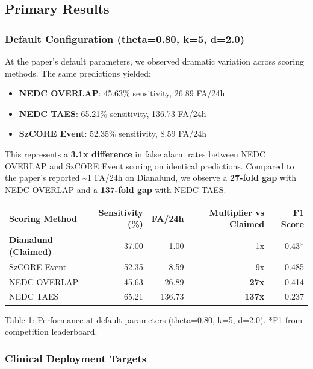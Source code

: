 \documentclass[
]{article}
\providecommand{\tightlist}{%
  \setlength{\itemsep}{0pt}\setlength{\parskip}{0pt}}
\begin{document}
\hypertarget{primary-results}{%
\subsection{Primary Results}\label{primary-results}}

\hypertarget{default-configuration-theta0.80-k5-d2.0}{%
\subsubsection{Default Configuration (theta=0.80, k=5,
d=2.0)}\label{default-configuration-theta0.80-k5-d2.0}}

At the paper's default parameters, we observed dramatic variation across
scoring methods. The same predictions yielded:

\begin{itemize}
\tightlist
\item
  \textbf{NEDC OVERLAP}: 45.63\% sensitivity, 26.89 FA/24h
\item
  \textbf{NEDC TAES}: 65.21\% sensitivity, 136.73 FA/24h
\item
  \textbf{SzCORE Event}: 52.35\% sensitivity, 8.59 FA/24h
\end{itemize}

This represents a \textbf{3.1x difference} in false alarm rates between
NEDC OVERLAP and SzCORE Event scoring on identical predictions. Compared
to the paper's reported \textasciitilde1 FA/24h on Dianalund, we observe
a \textbf{27-fold gap} with NEDC OVERLAP and a \textbf{137-fold gap}
with NEDC TAES.

\begin{longtable}[]{@{}lrrrr@{}}
\toprule
Scoring Method & Sensitivity (\%) & FA/24h & Multiplier vs Claimed & F1
Score\tabularnewline
\midrule
\endhead
\textbf{Dianalund (Claimed)} & 37.00 & 1.00 & 1x & 0.43*\tabularnewline
SzCORE Event & 52.35 & 8.59 & 9x & 0.485\tabularnewline
NEDC OVERLAP & 45.63 & 26.89 & \textbf{27x} & 0.414\tabularnewline
NEDC TAES & 65.21 & 136.73 & \textbf{137x} & 0.237\tabularnewline
\bottomrule
\end{longtable}

Table 1: Performance at default parameters (theta=0.80, k=5, d=2.0). *F1
from competition leaderboard.

\hypertarget{clinical-deployment-targets}{%
\subsubsection{Clinical Deployment
Targets}\label{clinical-deployment-targets}}
\end{document}

